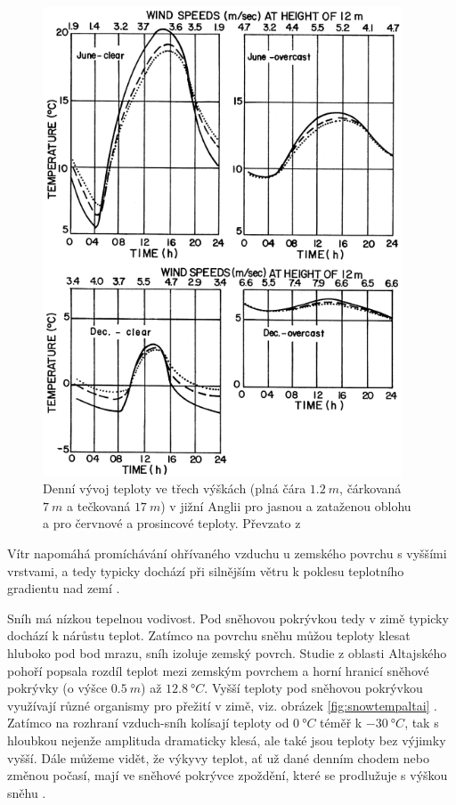 \begin{figure}
	\centering
	\includegraphics[width=0.95\textwidth]{img/ch1/diurnaltemp.png}
	\caption{Denní vývoj teploty ve třech výškách (plná čára $\SI{1.2}{m}$, čárkovaná $\SI{7}{m}$ a tečkovaná $\SI{17}{m}$) v jižní Anglii pro jasnou a zataženou oblohu a pro červnové a prosincové teploty. Převzato z \parencite{arya2001}}
	\label{fig:diurnaltemp}
\end{figure}

Vítr napomáhá promíchávání ohřívaného vzduchu u zemského povrchu s vyššími vrstvami, a tedy typicky dochází při silnějším větru k poklesu teplotního gradientu nad zemí \parencite{arya2001}.

Sníh má nízkou tepelnou vodivost. Pod sněhovou pokrývkou tedy v zimě typicky dochází k nárůstu teplot. Zatímco na povrchu sněhu můžou teploty klesat hluboko pod bod mrazu, sníh izoluje zemský povrch. Studie z oblasti Altajského pohoří popsala rozdíl teplot mezi zemským povrchem a horní hranicí sněhové pokrývky (o výšce $\SI{0.5}{m}$) až $\SI{12.8}{\degree C}$. Vyšší teploty pod sněhovou pokrývkou využívají různé organismy pro přežití v zimě, viz. obrázek \ref{fig:snowtempaltai} \parencite{hirakawahirofumi2018}. Zatímco na rozhraní vzduch-sníh kolísají teploty od $\SI{0}{\degree C}$ téměř k $\SI{-30}{\degree C}$, tak s hloubkou nejenže amplituda dramaticky klesá, ale také jsou teploty bez výjimky vyšší. Dále můžeme vidět, že výkyvy teplot, ať už dané denním chodem nebo změnou počasí, mají ve sněhové pokrývce zpoždění, které se prodlužuje s výškou sněhu \parencite{zhangwei2021}. 


